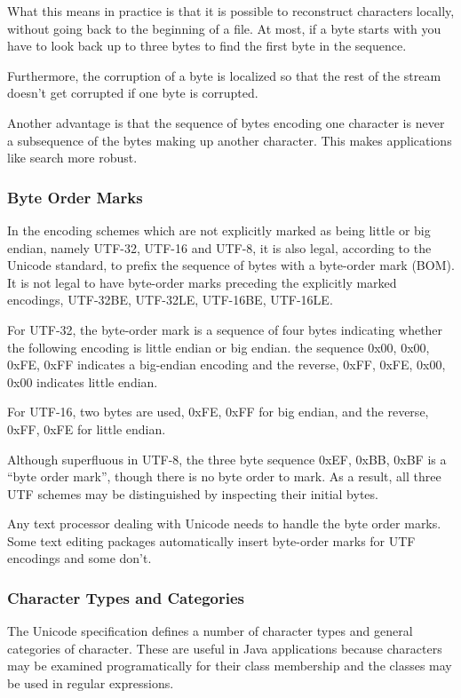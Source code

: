 What this means in practice is that it is possible to reconstruct
characters locally, without going back to the beginning of a file.
At most, if a byte starts with  you have to look back
up to three bytes to find the first byte in the sequence.

Furthermore, the corruption of a byte is localized so that the rest of
the stream doesn't get corrupted if one byte is corrupted.

Another advantage is that the sequence of bytes encoding one character
is never a subsequence of the bytes making up another character.  This
makes applications like search more robust.


\subsubsection{Byte Order Marks}

In the encoding schemes which are not explicitly marked as being
little or big endian, namely UTF-32, UTF-16 and UTF-8, it is also
legal, according to the Unicode standard, to prefix the sequence of
bytes with a byte-order mark (BOM).  It is not legal to have
byte-order marks preceding the explicitly marked encodings, UTF-32BE,
UTF-32LE, UTF-16BE, UTF-16LE.

For UTF-32, the byte-order mark is a sequence of four bytes indicating
whether the following encoding is little endian or big endian.  the
sequence 0x00, 0x00, 0xFE, 0xFF indicates a big-endian encoding and
the reverse, 0xFF, 0xFE, 0x00, 0x00 indicates little endian.

For UTF-16, two bytes are used, 0xFE, 0xFF for big endian, and the
reverse, 0xFF, 0xFE for little endian.

Although superfluous in UTF-8, the three byte sequence 0xEF, 0xBB,
0xBF is a ``byte order mark'', though there is no byte order to mark.  
As a result, all three UTF schemes may be distinguished by inspecting
their initial bytes.

Any text processor dealing with Unicode needs to handle the byte order
marks.  Some text editing packages automatically insert byte-order
marks for UTF encodings and some don't.

\subsubsection{Character Types and Categories}

The Unicode specification defines a number of character types and
general categories of character.  These are useful in Java
applications because characters may be examined programatically for
their class membership and the classes may be used in regular
expressions.

